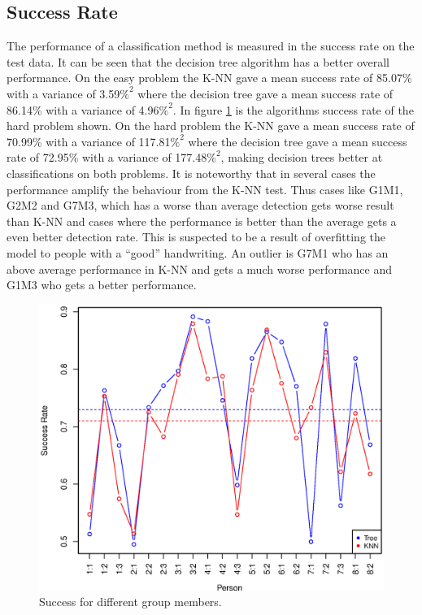 \subsection{Success Rate}
The performance of a classification method is measured in the success rate on the test data.
It can be seen that the decision tree algorithm has a better overall performance.
On the easy problem the K-NN gave a mean success rate of 
85.07\% with a variance of 3.59\(\%^2\)
where the decision tree gave a mean success rate of
86.14\% with a variance of 4.96\(\%^2\). 
In figure \ref{fig:success_comparison_hard} is the algorithms success rate of the hard problem shown.
On the hard problem the K-NN gave a mean success rate of 
70.99\% with a variance of 117.81\(\%^2\)
where the decision tree gave a mean success rate of
72.95\% with a variance of 177.48\(\%^2\), 
making decision trees better at classifications on both problems.
It is noteworthy that in several cases the performance amplify the behaviour from the K-NN test.
Thus cases like G1M1, G2M2 and G7M3, which has a worse than average detection gets worse result than K-NN 
and cases where the performance is better than the average gets a even better detection rate.
This is suspected to be a result of overfitting the model to people with a ``good'' handwriting.
An outlier is G7M1 who has an above average performance in K-NN and gets a much worse performance and G1M3 who gets a better performance.

\begin{figure}[H]
\centering
\includegraphics[width=\textwidth]{graphics/success_comp_hard}
\caption{Success for different group members.}
\label{fig:success_comparison_hard}
\end{figure}

